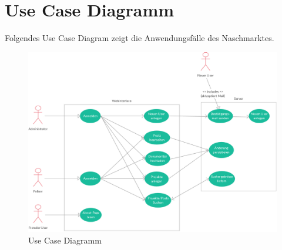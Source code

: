 \clearpage
\section{Use Case Diagramm}
Folgendes Use Case Diagram zeigt die Anwendungsf\"alle des Naschmarktes.

\begin{figure}[H]
	\begin{center}
		\includegraphics[width=\linewidth]{images/use_case.png}
		\caption{Use Case Diagramm}
	\end{center}
\end{figure}
